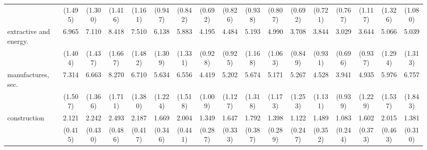 {\begin{tabular}{l*{16}{c}}
                    &     (1.495)         &     (1.300)         &     (1.416)         &     (1.161)         &     (0.947)         &     (0.842)         &     (0.692)         &     (0.826)         &     (0.938)         &     (0.807)         &     (0.692)         &     (0.721)         &     (0.767)         &     (1.117)         &     (1.326)         &     (1.080)         \\
[1em]
extractive and energy.&       6.965\sym{***}&       7.110\sym{***}&       8.418\sym{***}&       7.510\sym{***}&       6.138\sym{***}&       5.883\sym{***}&       4.195\sym{***}&       4.484\sym{***}&       5.193\sym{***}&       4.990\sym{***}&       3.708\sym{***}&       3.844\sym{***}&       3.029\sym{***}&       3.644\sym{***}&       5.066\sym{***}&       5.039\sym{***}\\
                    &     (1.404)         &     (1.437)         &     (1.667)         &     (1.482)         &     (1.309)         &     (1.331)         &     (0.928)         &     (0.925)         &     (1.168)         &     (1.063)         &     (0.849)         &     (0.931)         &     (0.696)         &     (0.937)         &     (1.294)         &     (1.313)         \\
[1em]
manufactures, sec.  &       7.314\sym{***}&       6.663\sym{***}&       8.270\sym{***}&       6.710\sym{***}&       5.634\sym{***}&       6.556\sym{***}&       4.419\sym{***}&       5.202\sym{***}&       5.674\sym{***}&       5.171\sym{***}&       5.267\sym{***}&       4.528\sym{***}&       3.941\sym{***}&       4.935\sym{***}&       5.976\sym{***}&       6.757\sym{***}\\
                    &     (1.507)         &     (1.366)         &     (1.711)         &     (1.380)         &     (1.224)         &     (1.518)         &     (1.009)         &     (1.127)         &     (1.318)         &     (1.173)         &     (1.253)         &     (1.131)         &     (0.939)         &     (1.229)         &     (1.537)         &     (1.843)         \\
[1em]
construction        &       2.121\sym{***}&       2.242\sym{***}&       2.493\sym{***}&       2.187\sym{***}&       1.669\sym{*}  &       2.004\sym{**} &       1.349         &       1.647\sym{*}  &       1.792\sym{**} &       1.398         &       1.122         &       1.489         &       1.083         &       1.602\sym{*}  &       2.015\sym{**} &       1.381         \\
                    &     (0.415)         &     (0.430)         &     (0.486)         &     (0.417)         &     (0.346)         &     (0.441)         &     (0.287)         &     (0.333)         &     (0.387)         &     (0.289)         &     (0.247)         &     (0.352)         &     (0.244)         &     (0.373)         &     (0.463)         &     (0.310)         \\

\end{tabular}}
